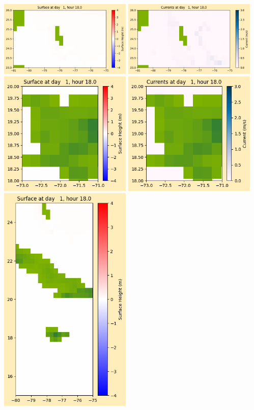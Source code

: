 \documentclass[11pt]{article}
\begin{document}
\vskip 10pt 
\includegraphics[width=0.475\textwidth]{frame0019fig1003.png}
\includegraphics[width=0.475\textwidth]{frame0019fig1004.png}
\vskip 10pt 
\includegraphics[width=0.475\textwidth]{frame0019fig1005.png}
\includegraphics[width=0.475\textwidth]{frame0019fig1006.png}
\vskip 10pt 
\includegraphics[width=0.475\textwidth]{frame0019fig1007.png}
\end{document}
